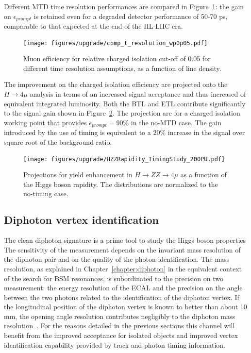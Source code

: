 Different MTD time resolution performances are compared in Figure~\ref{fig:muon_iso_res_comp}: the gain on $\epsilon_{prompt}$
is retained even for a degraded detector performance of 50-70 ps, comparable to that expected at the end of the HL-LHC era.

\begin{figure}[h!]
  \centering
  \texttt{[image: figures/upgrade/comp\_t\_resolution\_wp0p05.pdf]}
  \caption{Muon efficiency for relative charged isolation cut-off of 0.05 for different time resolution assumptions, as
    a function of line density.}
  \label{fig:muon_iso_res_comp}
\end{figure}

The improvement on the charged isolation efficiency are projected onto the $H \to 4\mu$ analysis in terms of
an increased signal acceptance and thus increased of equivalent integrated luminosity.
Both the BTL and ETL contribute significantly to the signal gain shown in Figure~\ref{fig:H_4mu_gain}. The
projection are for a charged isolation working point that provides $\epsilon_{prompt}= 90\%$ in the no-MTD case.
The gain introduced by the use of timing is equivalent to a $20\%$ increase in the signal over square-root of the background
ratio.

\begin{figure}
  \centering
  \texttt{[image: figures/upgrade/HZZRapidity\_TimingStudy\_200PU.pdf]}
  \caption{Projections for yield enhancement in $H\to ZZ\to 4\mu$ as a function of the Higgs boson rapidity.
    The distributions are normalized to the no-timing case.}
  \label{fig:H_4mu_gain}
\end{figure}

\clearpage
\subsection{Diphoton vertex identification}
The clean diphoton signature is a prime tool to study the Higgs boson properties
The sensitivity of the measurement depends on the invariant mass resolution of the diphoton pair
and on the quality of the photon identification.
The mass resolution, as explained in Chapter~\ref{chapter:diphoton} in the equivalent context of the search for BSM resonances,
is subordinated to the precision on two measurement: the energy resolution of the ECAL and the precision on the
angle between the two photons related to the identification of the diphoton vertex.
If the longitudinal position of the diphoton vertex is known to better than about 10 mm, the opening angle
resolution contributes negligibly to the diphoton mass resolution~\cite{Khachatryan:2014ira}.
For the reasons detailed in the previous sections this channel will
benefit from the improved acceptance for isolated objects and improved vertex identification
capability provided by track and photon timing information.

